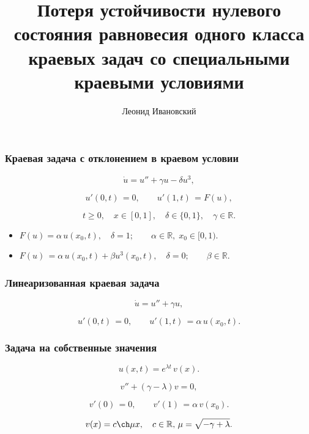 \documentclass[fullscreen=true, unicode, bookmarks=false]{beamer}
\title[]{ {\huge Потеря устойчивости нулевого состояния равновесия одного класса краевых задач со специальными краевыми условиями} }
\author[]{{\Large Леонид Ивановский}}
\date{ }
\institute[]
\begin{document}
\begin{frame}
\titlepage
\end{frame} 

\begin{frame}
\frametitle{ Краевая задача с отклонением в краевом условии }

\begin{equation}\label{boundary_problem}
	\dot u = u'' + \gamma u - \delta u^3,	
\end{equation}

\begin{equation}\label{boundary_cond}	
	u'(0, t) \, = 0, \qquad u'(1, t) \, = F(u),
\end{equation}

$$ t \geqslant 0, \quad x \in [0,1], \quad \delta \in \{0, 1\}, \quad \gamma \in \mathbb{R}. $$

\vfill
\pause

\begin{itemize}

\item $ F(u) = \alpha\,u(x_0, t), \quad \delta=1; \qquad \alpha \in \mathbb{R}, \; x_0 \in [0, 1). $
\item $ F(u) \, = \alpha\,u(x_0, t) + \beta u^3(x_0, t), \quad \delta=0; \qquad \beta \in \mathbb{R}. $

\end{itemize}

\end{frame}

\begin{frame}
\frametitle{ Линеаризованная краевая задача }
 
\begin{equation}
	\dot u = u'' + \gamma u,	
\end{equation}

\vfill

\begin{equation}
	u'(0, t) \, = 0, \qquad u'(1, t) \, = \alpha\,u(x_0, t).
\end{equation}

\end{frame}

\begin{frame}
\frametitle{ Задача на собственные значения }
 
$$ u(x, t) = e^{\lambda t} \, v(x). $$

\bigskip
\pause
 
\begin{equation} 
	v'' + (\gamma - \lambda)v = 0,
\end{equation}

\vfill

\begin{equation} 
	v'(0) \, = 0, \qquad v'(1) \, = \alpha\,v(x_0).
\end{equation}

\vfill
\pause

$$ v(x) = c \ch  \mu x, \quad c \in \mathbb{R}, \, \mu = \sqrt{-\gamma + \lambda}. $$

\end{frame}
\end{document}
